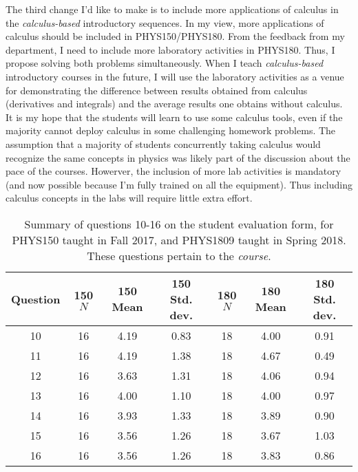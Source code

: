 \documentclass[../../main.tex]{subfiles}
\begin{document}
The third change I'd like to make is to include more applications of calculus in the \textit{calculus-based} introductory sequences.  In my view, more applications of calculus should be included in PHYS150/PHYS180.  From the feedback from my department, I need to include more laboratory activities in PHYS180.  Thus, I propose solving both problems simultaneously.  When I teach \textit{calculus-based} introductory courses in the future, I will use the laboratory activities as a venue for demonstrating the difference between results obtained from calculus (derivatives and integrals) and the average results one obtains without calculus. It is my hope that the students will learn to use some calculus tools, even if the majority cannot deploy calculus in some challenging homework problems.  The assumption that a majority of students concurrently taking calculus would recognize the same concepts in physics was likely part of the discussion about the pace of the courses.  Howerver, the inclusion of more lab activities is mandatory (and now possible because I'm fully trained on all the equipment). Thus including calculus concepts in the labs will require little extra effort. \\ \hspace{0.1cm}

\begin{table}
\small
\centering
\begin{tabular}{| c | c | c | c | c | c | c |}
\hline \hline
Question & 150 $N$ & 150 Mean & 150 Std. dev. & 180 $N$ & 180 Mean & 180 Std. dev. \\ \hline
10 & 16 & 4.19 & 0.83 & 18 & 4.00 & 0.91 \\ \hline
11 & 16 & 4.19 & 1.38 & 18 & 4.67 & 0.49 \\ \hline
12 & 16 & 3.63 & 1.31 & 18 & 4.06 & 0.94 \\ \hline
13 & 16 & 4.00 & 1.10 & 18 & 4.00 & 0.97 \\ \hline
14 & 16 & 3.93 & 1.33 & 18 & 3.89 & 0.90 \\ \hline
15 & 16 & 3.56 & 1.26 & 18 & 3.67 & 1.03 \\ \hline
16 & 16 & 3.56 & 1.26 & 18 & 3.83 & 0.86 \\ \hline
\hline
\end{tabular}
\caption{\label{tab:courses:intro_eval_3} Summary of questions 10-16 on the student evaluation form, for PHYS150 taught in Fall 2017, and PHYS1809 taught in Spring 2018.  These questions pertain to the \textit{course}.}
\end{table}
\end{document}
